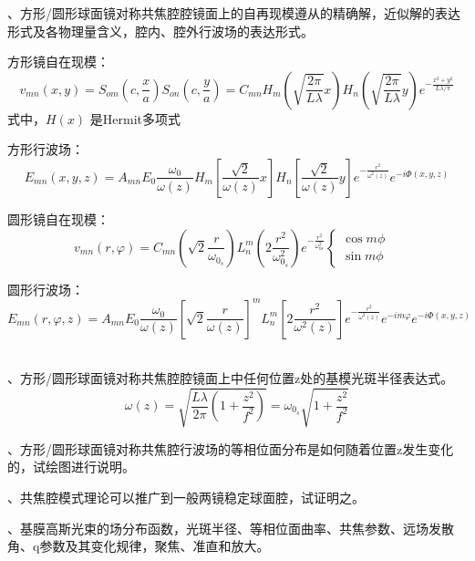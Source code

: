 \documentclass[12pt]{article}
\begin{document}
{、方形/圆形球面镜对称共焦腔腔镜面上的自再现模遵从的精确解，近似解的表达形式及各物理量含义，腔内、腔外行波场的表达形式。
}
{\kaishu
\par 方形镜自在现模：
\begin{equation*}
	v_{mn}(x,y)
	=
	S_{om}\left(c,\frac{x}{a} \right)
	S_{on}\left( c,\frac{y}{a} \right)
	=C_{mn}
	H_m \left( \sqrt{\frac{2\pi}{L\lambda} }x \right)
	H_n \left( \sqrt{\frac{2\pi}{L\lambda} } y\right)
	e^{-\frac{x^2+y^2}{L\lambda/\pi} }
\end{equation*}
式中，$H(x)$ 是Hermit多项式
\par 方形行波场：
\begin{equation*}
	E_{mn}(x,y,z)=A_{mn}E_0 \frac{\omega_0}{\omega(z)} 
	H_m \left[ \frac{\sqrt2}{\omega(z)} x \right]
	H_n \left[ \frac{\sqrt2}{\omega(z)} y \right]
	e^{-\frac{r^2}{\omega^2(z)} }
	e^{-i\Phi(x,y,z)}
\end{equation*}
\par 圆形镜自在现模：
\begin{equation*}
	v_{mn}(r,\varphi)
	=C_{mn}\left( \sqrt{2}\frac{r}{\omega_{0_s}}  \right)
	 L_n^m \left( 2 \frac{r^2}{\omega_{0_s}^2}  \right)
	 e^{-\frac{r^2}{\omega_{0s}^2} } 
	\begin{cases}
		\cos m\phi &\\
		\sin m\phi
	\end{cases}
\end{equation*}
\par 圆形行波场：
\begin{equation*}
	E_{mn}(r,\varphi,z)=A_{mn}E_0 \frac{\omega_0}{\omega(z)} 
	\left[ \sqrt2 \frac{r}{\omega(z)}  \right]^m
	L_n^m \left[ 2 \frac{r^2}{\omega^2(z)}  \right]
	e^{-\frac{r^2}{\omega^2(z)}} e^{-im\varphi} e^{-i\Phi(x,y,z)}
\end{equation*}
\\}

{、方形/圆形球面镜对称共焦腔腔镜面上中任何位置z处的基模光斑半径表达式。
}
\begin{equation*}
	\omega(z)=
	\sqrt{\frac{L\lambda}{2\pi} \left( 1+ \frac{z^2}{f^2}  \right)} 
	= \omega_{0_s}\sqrt{1+\frac{z^2}{f^2} }
\end{equation*}

{、方形/圆形球面镜对称共焦腔行波场的等相位面分布是如何随着位置z发生变化的，试绘图进行说明。
}

{、共焦腔模式理论可以推广到一般两镜稳定球面腔，试证明之。
}

{、基膜高斯光束的场分布函数，光斑半径、等相位面曲率、共焦参数、远场发散角、q参数及其变化规律，聚焦、准直和放大。
}
\end{document}
